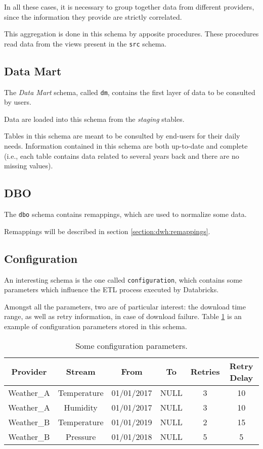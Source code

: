     In all these cases, it is necessary to group together data from different providers, since the information they provide are strictly correlated.
    
    This aggregation is done in this schema by apposite procedures.
    These procedures read data from the views present in the \texttt{src} schema.

\subsection{Data Mart}
    The \textit{Data Mart} schema, called \texttt{dm}, contains the first layer of data to be consulted by users.
    
    Data are loaded into this schema from the \textit{staging} stables.
    
    Tables in this schema are meant to be consulted by end-users for their daily needs.
    Information contained in this schema are both up-to-date and complete (i.e., each table contains data related to several years back and there are no missing values).
    
\subsection{DBO}
    The \texttt{dbo} schema contains remappings, which are used to normalize some data.
    
    Remappings will be described in section \ref{section:dwh:remappings}.

\subsection{Configuration}
    An interesting schema is the one called \texttt{configuration}, which contains some parameters which influence the ETL process executed by Databricks.
    
    Amongst all the parameters, two are of particular interest: the download time range, as well as retry information, in case of download failure.
    Table \ref{tab:dwh:configuration} is an example of configuration parameters stored in this schema.
    
    \begin{table}
        \centering
        \begin{tabular}{|c c|c c|c c|}
            \toprule
             Provider   & Stream      & From       & To   & Retries & Retry Delay \\
             \midrule
             Weather\_A & Temperature & 01/01/2017 & NULL & 3       & 10         \\
             Weather\_A & Humidity    & 01/01/2017 & NULL & 3       & 10         \\
             Weather\_B & Temperature & 01/01/2019 & NULL & 2       & 15         \\
             Weather\_B & Pressure    & 01/01/2018 & NULL & 5       & 5         \\
             \bottomrule
        \end{tabular}
        \caption{Some configuration parameters.}
        \label{tab:dwh:configuration}
    \end{table}
    
